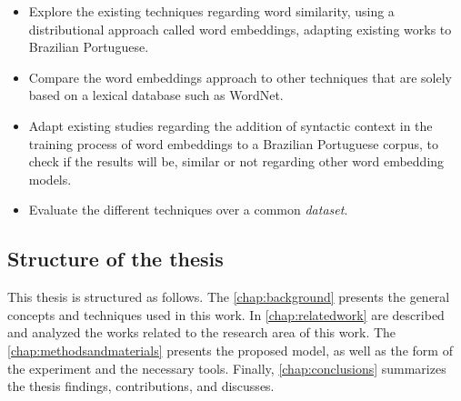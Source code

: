 \begin{itemize}
    \item Explore the existing techniques regarding word similarity, using a distributional approach called word embeddings, adapting existing works to Brazilian Portuguese.
    \item Compare the word embeddings approach to other techniques that are solely based on a lexical database such as WordNet.
    \item Adapt existing studies regarding the addition of syntactic context in the training process of word embeddings to a Brazilian Portuguese corpus, to check if the results will be, similar or not regarding other word embedding models. 
    \item Evaluate the different techniques over a common \textit{dataset}.
\end{itemize}

\subsection{Structure of the thesis}

This thesis is structured as follows. The \autoref{chap:background} presents the general concepts and techniques used in this work. In \autoref{chap:relatedwork} are described and analyzed the works related to the research area of this work. The \autoref{chap:methodsandmaterials} presents the proposed model, as well as the form of the experiment and the necessary tools. 
Finally, \autoref{chap:conclusions} summarizes the thesis findings, contributions, and discusses.


